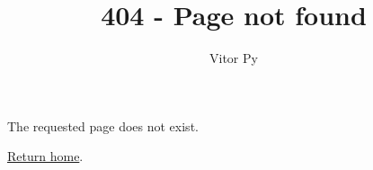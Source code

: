 \documentclass{article}
\title{404 - Page not found}
\author{Vitor Py}
\date{}
\begin{document}

\maketitle

The requested page does not exist.\par

\href{/}{Return home}.


\end{document}
